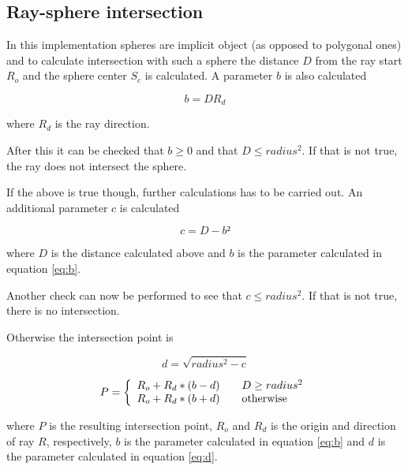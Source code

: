 \documentclass[a4paper]{report}
\begin{document}
\subsection{Ray-sphere intersection}

In this implementation spheres are implicit object (as opposed to
polygonal ones) and to calculate intersection with such a sphere the
distance \(D\) from the ray start \(R_o\) and the sphere center \(S_c\) is
calculated. A parameter \(b\) is also calculated 

\begin{equation}
 b = D R_d
 \label{eq:b}
\end{equation}

where \(R_d\) is the ray direction.

After this it can be checked that \(b \geq 0\) and that \(D \leq
radius^2\). If that is not true, the ray does not intersect the
sphere.

If the above is true though, further calculations has to be carried
out. An additional parameter \(c\) is calculated

\begin{equation}
  c = D - b²
\end{equation}

where \(D\) is the distance calculated above and \(b\) is the
parameter calculated in equation \ref{eq:b}.

Another check can now be performed to see that \(c \leq radius^2\). If
that is not true, there is no intersection.

Otherwise the intersection point is

\begin{equation}
  d = \sqrt{radius^2 - c}
  \label{eq:d}
\end{equation}

\begin{equation}
  P = \left \{ 
  \begin{array}{l l}
    R_o + R_d *(b-d) & \quad D \geq radius^2 \\
    R_o + R_d *(b+d) & \quad \text{otherwise} \\
  \end{array} \right.
\end{equation}

where \(P\) is the resulting intersection point, \(R_o\) and \(R_d\)
is the origin and direction of ray \(R\), respectively, \(b\) is the
parameter calculated in equation \ref{eq:b} and \(d\) is the parameter
calculated in equation \ref{eq:d}.
\end{document}
